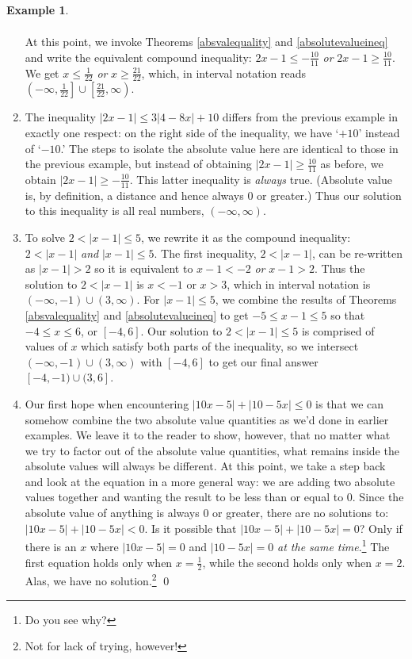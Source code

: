 \documentclass[11pt]{article}
\theoremstyle{definition}  %
\newtheorem{ex}{\bf Example}
\begin{document}
\begin{ex}
\begin{enumerate}
\[\begin{array}{rclr}
\end{array}\] At this point, we invoke Theorems \ref{absvalequality} and \ref{absolutevalueineq} and write the equivalent compound inequality:  $2x - 1 \leq -\frac{10}{11}$ \textit{or} $2x-1 \geq \frac{10}{11}$.  We get $x \leq \frac{1}{22}$ \textit{or} $x \geq \frac{21}{22}$, which, in interval notation reads $\left(-\infty, \frac{1}{22}\right] \cup \left[\frac{21}{22}, \infty\right)$.

\item  The inequality  $|2x - 1| \leq 3|4 - 8x| + 10$ differs from the previous example in exactly one respect: on the right side of the inequality, we have `$+10$' instead of `$-10$.' The steps to isolate the absolute value here are identical to those in the previous example, but instead of obtaining $|2x - 1| \geq  \frac{10}{11}$ as before, we obtain $|2x - 1| \geq  -\frac{10}{11}$.  This latter inequality is \textit{always} true. (Absolute value is, by definition, a distance and hence always $0$ or greater.)  Thus our solution to this inequality is all real numbers, $(-\infty, \infty)$.


\item  To solve  $2 < |x-1| \leq 5$, we rewrite it as the compound inequality: $2 < |x-1|$ \textit{and} $|x-1| \leq 5$.   The first inequality, $2 < |x-1|$, can be re-written as $|x-1|>2$ so it is equivalent to  $x-1 < -2$ \textit{or} $x-1 > 2$.  Thus the solution to $2 < |x-1|$ is $x<-1$ or $x>3$, which in interval notation is  $(-\infty, -1) \cup (3, \infty)$.  For $|x-1| \leq 5$, we combine the results of Theorems \ref{absvalequality} and \ref{absolutevalueineq} to get $-5 \leq x-1 \leq 5$ so that $-4 \leq x \leq 6$, or $[-4,6]$.  Our solution to   $2 < |x-1| \leq 5$ is comprised of values of $x$ which satisfy both parts of the inequality, so we intersect $(-\infty, -1) \cup (3, \infty)$ with $[-4,6]$ to get our final answer $[-4,-1) \cup (3,6]$. 

\item Our first hope when encountering $|10 x - 5| + |10 - 5x| \leq 0$ is that we can somehow combine the two absolute value quantities as we'd done in earlier examples.  We leave it to the reader to show, however, that no matter what we try to factor out of the absolute value quantities, what remains inside the absolute values will always be different.  At this point, we take a step back and look at the equation in a more general way:  we are adding two absolute values together and wanting the result to be less than or equal to $0$.  Since the absolute value of anything is always $0$ or greater, there are no solutions to:  $|10x - 5| + |10 - 5x| < 0$.  Is it possible that $|10x - 5| + |10 - 5x| = 0$?  Only if there is an $x$ where $|10x-5| = 0$ and $|10-5x| = 0$ \textit{at the same time}.\footnote{Do you see why?}  The first equation holds only when $x = \frac{1}{2}$, while the second holds only when $x = 2$.  Alas, we have no solution.\footnote{Not for lack of trying, however!}   \qed

\end{enumerate}

\end{ex}
\end{document}
